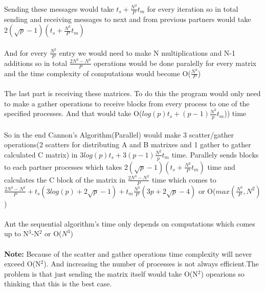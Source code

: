 \\
Sending these messages would take $t_s+\frac{N^2}{P}t_m$ for every iteration so in total sending and receiving messages to next and from previous partners would take $2(\sqrt{p}-1)(t_s+\frac{N^2}{P}t_m)$\\
\\
And for every $\frac{N^2}{P}$ entry we would need to make N multiplications and N-1 additions so in total $\frac{2N^3-N^2}{P}$ operations would be done paralelly for every matrix and the time complexity of computations would become O($\frac{N^3}{P}$)\\
\\
The last part is receiving these matrices. To do this the program would only need to make a gather operations to receive blocks from every process to one of the specified processes. And that would take O(\(log(p)t_s+(p-1)\frac{N^2}{p}t_m\))) time\\
\\
So in the end Cannon's Algorithm(Parallel) would make 3 scatter/gather operations(2 scatters for distributing A and B matrixes and 1 gather to gather calculated C matrix) in \(3log(p)t_s+3(p-1)\frac{N^2}{p}t_m\) time. Parallely sends blocks to each partner processes which takes $2(\sqrt{p}-1)(t_s+\frac{N^2}{P}t_m)$ time and calculates the C block of the matrix in $\frac{2N^3-N^2}{P}$ time which comes to \(\frac{2N^3-N^2}{P}+t_s(3log(p)+2\sqrt{p}-1)+t_m\frac{N^2}{P}(3p+2\sqrt{p}-4)\) or O(\(max(\frac{N^3}{P},N^2)\))\\
\\
Ant the sequential algorithm's time only depends on computations which comes up to N$^3$-N$^2$ or O($N^3$)\\
\\
\textbf{Note:} Because of the scatter and gather operations time complexity will never exceed O(N$^2$). And increasing the number of processes is not always efficient.The problem is that just sending the matrix itself would take O(N$^2$) opearions so thinking that this is the best case.